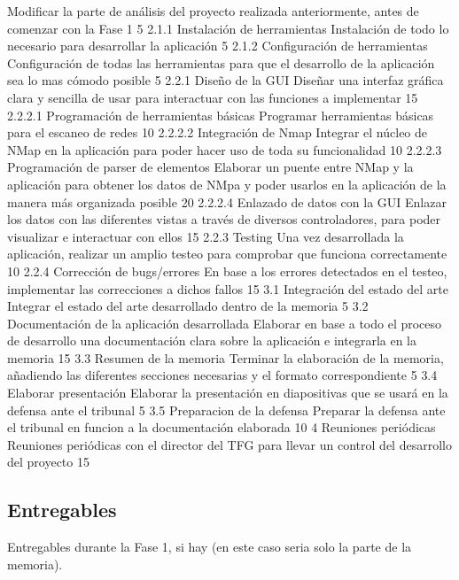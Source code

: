 	{Modificar la parte de análisis del proyecto realizada anteriormente, antes de comenzar con la Fase 1}
	{5}					
\taskframe
	{2.1.1}
	{Instalación de herramientas}
	{Instalación de todo lo necesario para desarrollar la aplicación}
	{5}
\taskframe
	{2.1.2}
	{Configuración de herramientas}
	{Configuración de todas las herramientas para que el desarrollo de la aplicación sea lo mas cómodo posible}
	{5}
\taskframe
	{2.2.1}
	{Diseño de la GUI}
	{Diseñar una interfaz gráfica clara y sencilla de usar para interactuar con las funciones a implementar}
	{15}
\taskframe
	{2.2.2.1}
	{Programación de herramientas básicas}
	{Programar herramientas básicas para el escaneo de redes}
	{10}
\taskframe
	{2.2.2.2}
	{Integración de Nmap}
	{Integrar el núcleo de NMap en la aplicación para poder hacer uso de toda su funcionalidad}
	{10}
\taskframe
	{2.2.2.3}
	{Programación de parser de elementos}
	{Elaborar un puente entre NMap y la aplicación para obtener los datos de NMpa y poder usarlos en la aplicación de la manera más organizada posible}
	{20}
\taskframe
	{2.2.2.4}
	{Enlazado de datos con la GUI}
	{Enlazar los datos con las diferentes vistas a través de diversos controladores, para poder visualizar e interactuar con ellos}
	{15}
\taskframe
	{2.2.3}
	{Testing}
	{Una vez desarrollada la aplicación, realizar un amplio testeo para comprobar que funciona correctamente}
	{10}
\taskframe
	{2.2.4}
	{Corrección de bugs/errores}
	{En base a los errores detectados en el testeo, implementar las correcciones a dichos fallos}
	{15}
\taskframe
	{3.1}
	{Integración del estado del arte}
	{Integrar el estado del arte desarrollado dentro de la memoria}
	{5}
\taskframe
	{3.2}
	{Documentación de la aplicación desarrollada}
	{Elaborar en base a todo el proceso de desarrollo una documentación clara sobre la aplicación e integrarla en la memoria}
	{15}
\taskframe
	{3.3}
	{Resumen de la memoria}
	{Terminar la elaboración de la memoria, añadiendo las diferentes secciones necesarias y el formato correspondiente}
	{5}
\taskframe
	{3.4}
	{Elaborar presentación}
	{Elaborar la presentación en diapositivas que se usará en la defensa ante el tribunal}
	{5}
\taskframe
	{3.5}
	{Preparacion de la defensa}
	{Preparar la defensa ante el tribunal en funcion a la documentación elaborada}
	{10}
\taskframe
	{4}
	{Reuniones periódicas}
	{Reuniones periódicas con el director del TFG para llevar un control del desarrollo del proyecto}
	{15}

\subsection{Entregables}
{\color{red} Entregables durante la Fase 1, si hay (en este caso seria solo la parte de la memoria).}

